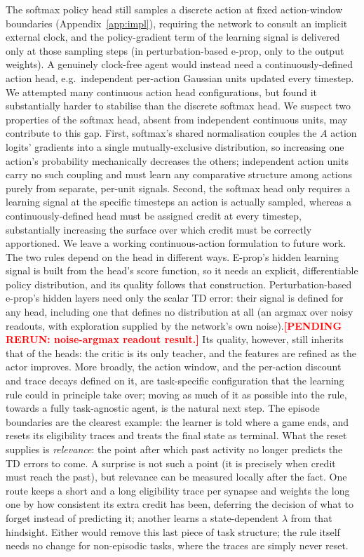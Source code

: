 \documentclass[10pt,twocolumn]{article}
\newcommand{\pending}[1]{\textcolor{red}{\bfseries[PENDING RERUN#1]}}
\newcommand{\method}{perturbation-based e-prop}   %
\newcommand{\Method}{Perturbation-based e-prop}   %
\begin{document}
The softmax policy head still
samples a discrete action at fixed action-window boundaries
(Appendix~\ref{app:impl}), requiring the network to consult an implicit
external clock, and the policy-gradient term of the learning signal is
delivered only at those sampling steps (in \method{}, only to the
output weights). A genuinely clock-free agent would instead need a
continuously-defined action head, e.g.\ independent per-action Gaussian units
updated every timestep. We attempted many continuous action head
configurations, but found it substantially harder to stabilise than the
discrete softmax head. We suspect two properties of the softmax head, absent from independent
continuous units, may contribute to this gap. First, softmax's shared
normalisation couples the $A$ action logits' gradients into a single
mutually-exclusive distribution, so increasing one action's probability
mechanically decreases the others; independent action units carry no such
coupling and must learn any comparative structure among actions purely from
separate, per-unit signals. Second, the softmax head only requires a learning
signal at the specific timesteps an action is actually sampled, whereas a
continuously-defined head must be assigned credit at every timestep,
substantially increasing the surface over which credit must be correctly
apportioned. We leave a working continuous-action formulation to future work. The two rules depend on the head in different ways. E-prop's hidden learning
signal is built from the head's score function, so it needs an explicit,
differentiable policy distribution, and its quality follows that construction.
\Method{}'s hidden layers need only the scalar TD error: their signal is
defined for any head, including one that defines no distribution at all (an
argmax over noisy readouts, with exploration supplied by the network's own
noise).\pending{: noise-argmax readout result.} Its quality, however, still
inherits that of the heads: the critic is its only teacher, and the features
are refined as the actor improves.
More broadly, the action window, and the per-action discount and trace decays
defined on it, are task-specific configuration that the learning rule could in
principle take over; moving as much of it as possible into the rule, towards a
fully task-agnostic agent, is the natural next step. The episode boundaries are
the clearest example: the learner is told where a game ends, and resets its
eligibility traces and treats the final state as terminal. What the reset supplies is
\emph{relevance}: the point after which past activity no longer predicts the TD
errors to come. A surprise is not such a point (it is precisely when credit
must reach the past), but relevance can be measured locally after the fact.
One route keeps a short and a long eligibility trace per synapse and weights the
long one by how consistent its extra credit has been, deferring the decision of
what to forget instead of predicting it; another learns a state-dependent
$\lambda$ from that hindsight. Either would remove this last piece of task
structure; the rule itself needs no change for non-episodic tasks, where the
traces are simply never reset.
\end{document}
